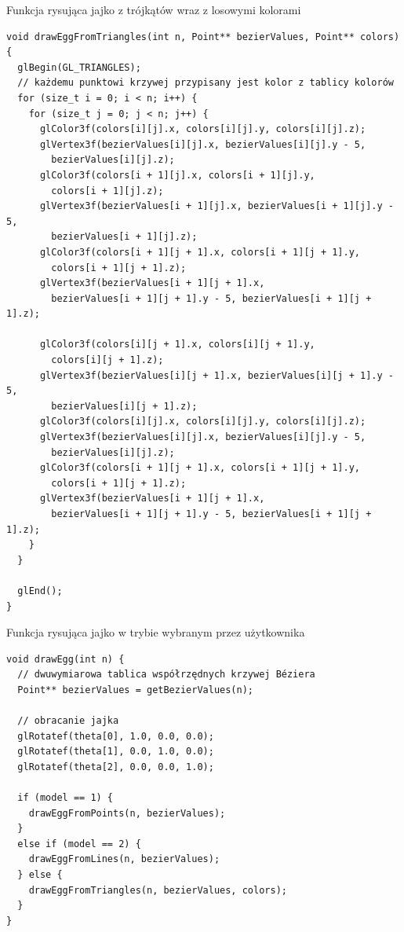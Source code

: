 \documentclass[12pt,a4paper,titlepage]{article}
\begin{document}
\begin{listing}[H]
\caption{Funkcja rysująca jajko z trójkątów wraz z losowymi kolorami}
\begin{verbatim}
void drawEggFromTriangles(int n, Point** bezierValues, Point** colors) {
  glBegin(GL_TRIANGLES);
  // każdemu punktowi krzywej przypisany jest kolor z tablicy kolorów
  for (size_t i = 0; i < n; i++) {
    for (size_t j = 0; j < n; j++) {
      glColor3f(colors[i][j].x, colors[i][j].y, colors[i][j].z);
      glVertex3f(bezierValues[i][j].x, bezierValues[i][j].y - 5, 
        bezierValues[i][j].z);
      glColor3f(colors[i + 1][j].x, colors[i + 1][j].y,
        colors[i + 1][j].z);
      glVertex3f(bezierValues[i + 1][j].x, bezierValues[i + 1][j].y - 5, 
        bezierValues[i + 1][j].z);
      glColor3f(colors[i + 1][j + 1].x, colors[i + 1][j + 1].y,
        colors[i + 1][j + 1].z);
      glVertex3f(bezierValues[i + 1][j + 1].x,
        bezierValues[i + 1][j + 1].y - 5, bezierValues[i + 1][j + 1].z);

      glColor3f(colors[i][j + 1].x, colors[i][j + 1].y,
        colors[i][j + 1].z);
      glVertex3f(bezierValues[i][j + 1].x, bezierValues[i][j + 1].y - 5, 
        bezierValues[i][j + 1].z);
      glColor3f(colors[i][j].x, colors[i][j].y, colors[i][j].z);
      glVertex3f(bezierValues[i][j].x, bezierValues[i][j].y - 5, 
        bezierValues[i][j].z);
      glColor3f(colors[i + 1][j + 1].x, colors[i + 1][j + 1].y,
        colors[i + 1][j + 1].z);
      glVertex3f(bezierValues[i + 1][j + 1].x,
        bezierValues[i + 1][j + 1].y - 5, bezierValues[i + 1][j + 1].z);
    }
  }

  glEnd();
}
\end{verbatim}
\end{listing}

\begin{listing}[H]
\caption{Funkcja rysująca jajko w trybie wybranym przez użytkownika}
\begin{verbatim}
void drawEgg(int n) {
  // dwuwymiarowa tablica współrzędnych krzywej Béziera
  Point** bezierValues = getBezierValues(n);

  // obracanie jajka
  glRotatef(theta[0], 1.0, 0.0, 0.0);
  glRotatef(theta[1], 0.0, 1.0, 0.0);
  glRotatef(theta[2], 0.0, 0.0, 1.0);

  if (model == 1) {
    drawEggFromPoints(n, bezierValues);
  }
  else if (model == 2) {
    drawEggFromLines(n, bezierValues);
  } else {
    drawEggFromTriangles(n, bezierValues, colors);
  }
}
\end{verbatim}
\end{listing}
\newpage
\end{document}
